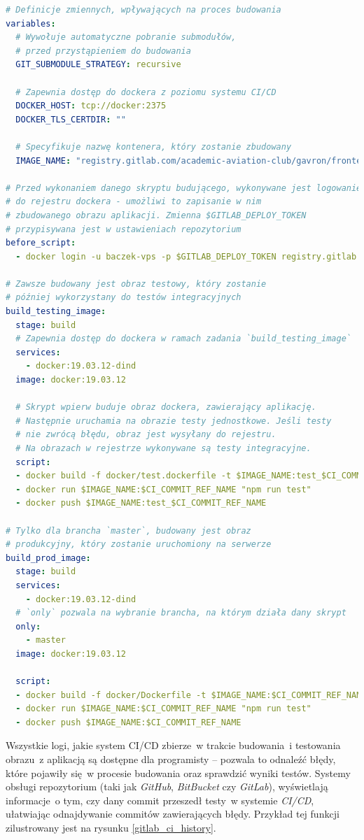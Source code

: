 \begin{lstlisting}[language=yml, label=list:ci_cd_frontend,caption={Plik konfiguracyjny \textit{Gitlab CI}, budujący aplikację kliencką }, basicstyle=\footnotesize\ttfamily]
# Definicje zmiennych, wpływających na proces budowania
variables:
  # Wywołuje automatyczne pobranie submodułów,
  # przed przystąpieniem do budowania 
  GIT_SUBMODULE_STRATEGY: recursive
 
  # Zapewnia dostęp do dockera z poziomu systemu CI/CD
  DOCKER_HOST: tcp://docker:2375
  DOCKER_TLS_CERTDIR: "" 

  # Specyfikuje nazwę kontenera, który zostanie zbudowany 
  IMAGE_NAME: "registry.gitlab.com/academic-aviation-club/gavron/frontend"

# Przed wykonaniem danego skryptu budującego, wykonywane jest logowanie
# do rejestru dockera - umożliwi to zapisanie w nim 
# zbudowanego obrazu aplikacji. Zmienna $GITLAB_DEPLOY_TOKEN
# przypisywana jest w ustawieniach repozytorium
before_script:
  - docker login -u baczek-vps -p $GITLAB_DEPLOY_TOKEN registry.gitlab.com

# Zawsze budowany jest obraz testowy, który zostanie
# później wykorzystany do testów integracyjnych
build_testing_image:
  stage: build
  # Zapewnia dostęp do dockera w ramach zadania `build_testing_image`
  services:
    - docker:19.03.12-dind
  image: docker:19.03.12
  
  # Skrypt wpierw buduje obraz dockera, zawierający aplikację.
  # Następnie uruchamia na obrazie testy jednostkowe. Jeśli testy
  # nie zwrócą błędu, obraz jest wysyłany do rejestru.
  # Na obrazach w rejestrze wykonywane są testy integracyjne.
  script:
  - docker build -f docker/test.dockerfile -t $IMAGE_NAME:test_$CI_COMMIT_REF_NAME .
  - docker run $IMAGE_NAME:$CI_COMMIT_REF_NAME "npm run test"
  - docker push $IMAGE_NAME:test_$CI_COMMIT_REF_NAME

# Tylko dla brancha `master`, budowany jest obraz 
# produkcyjny, który zostanie uruchomiony na serwerze
build_prod_image:
  stage: build
  services:
	- docker:19.03.12-dind	
  # `only` pozwala na wybranie brancha, na którym działa dany skrypt
  only:
    - master
  image: docker:19.03.12
   
  script:
  - docker build -f docker/Dockerfile -t $IMAGE_NAME:$CI_COMMIT_REF_NAME .
  - docker run $IMAGE_NAME:$CI_COMMIT_REF_NAME "npm run test"
  - docker push $IMAGE_NAME:$CI_COMMIT_REF_NAME
\end{lstlisting}

Wszystkie logi, jakie system CI/CD zbierze~w trakcie budowania~i testowania obrazu~z aplikacją są
dostępne dla programisty -- pozwala to odnaleźć błędy, które pojawiły się~w procesie budowania oraz
sprawdzić wyniki testów. Systemy obsługi repozytorium (taki jak \textit{GitHub}, \textit{BitBucket}
czy \textit{GitLab}), wyświetlają informacje~o tym, czy dany commit przeszedł testy~w systemie
\textit{CI/CD}, ułatwiając odnajdywanie commitów zawierających błędy. Przykład tej funkcji
zilustrowany jest na rysunku \ref{gitlab_ci_history}.

